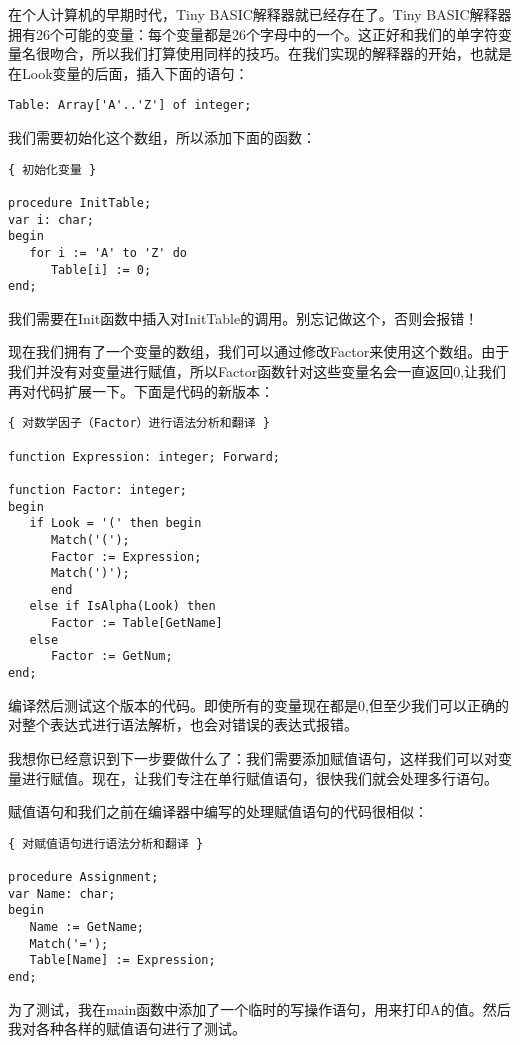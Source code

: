 在个人计算机的早期时代，Tiny BASIC解释器就已经存在了。Tiny BASIC解释器拥有26个可能的变量：每个变量都是26个字母中的一个。这正好和我们的单字符变量名很吻合，所以我们打算使用同样的技巧。在我们实现的解释器的开始，也就是在Look变量的后面，插入下面的语句：

\begin{verbatim}
Table: Array['A'..'Z'] of integer;
\end{verbatim}

我们需要初始化这个数组，所以添加下面的函数：

\begin{verbatim}
{ 初始化变量 }

procedure InitTable;
var i: char;
begin
   for i := 'A' to 'Z' do
      Table[i] := 0;
end;
\end{verbatim}

我们需要在Init函数中插入对InitTable的调用。别忘记做这个，否则会报错！

现在我们拥有了一个变量的数组，我们可以通过修改Factor来使用这个数组。由于我们并没有对变量进行赋值，所以Factor函数针对这些变量名会一直返回0,让我们再对代码扩展一下。下面是代码的新版本：

\begin{verbatim}
{ 对数学因子（Factor）进行语法分析和翻译 }

function Expression: integer; Forward;

function Factor: integer;
begin
   if Look = '(' then begin
      Match('(');
      Factor := Expression;
      Match(')');
      end
   else if IsAlpha(Look) then
      Factor := Table[GetName]
   else
      Factor := GetNum;
end;
\end{verbatim}

编译然后测试这个版本的代码。即使所有的变量现在都是0,但至少我们可以正确的对整个表达式进行语法解析，也会对错误的表达式报错。

我想你已经意识到下一步要做什么了：我们需要添加赋值语句，这样我们可以对变量进行赋值。现在，让我们专注在单行赋值语句，很快我们就会处理多行语句。

赋值语句和我们之前在编译器中编写的处理赋值语句的代码很相似：

\begin{verbatim}
{ 对赋值语句进行语法分析和翻译 }

procedure Assignment;
var Name: char;
begin
   Name := GetName;
   Match('=');
   Table[Name] := Expression;
end;
\end{verbatim}

为了测试，我在main函数中添加了一个临时的写操作语句，用来打印A的值。然后我对各种各样的赋值语句进行了测试。

